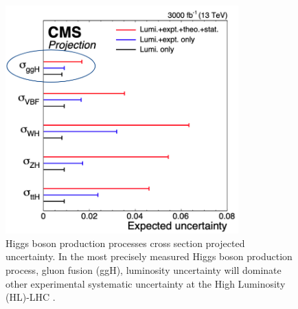 
\begin{figure}[!htp]
\centering
\includegraphics[width=0.8\textwidth]{ashish_thesis/lumi_precision.png}
\caption[Phase II Uncertainty Projection]{ %
   Higgs boson production processes cross section projected uncertainty. In the most precisely measured Higgs boson production process, gluon fusion (ggH), luminosity uncertainty will dominate other experimental systematic uncertainty at the High Luminosity (HL)-LHC \cite{Dainese:2703572}.
}
\label{fig:lum_unc}
\end{figure}

